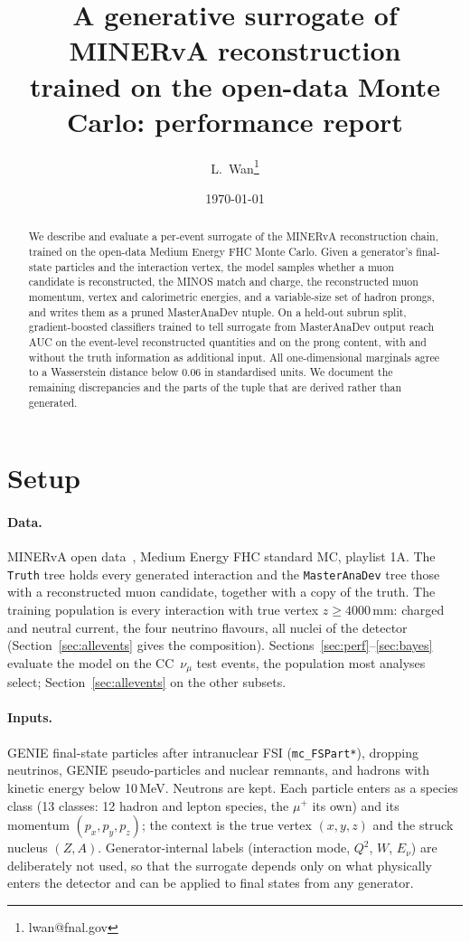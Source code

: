 \documentclass[11pt]{article}
\title{A generative surrogate of MINERvA reconstruction\\ trained on the open-data Monte Carlo: performance report}
\author{L.~Wan\thanks{lwan@fnal.gov}}
\date{\today}
\begin{document}
\maketitle

\begin{abstract}
We describe and evaluate a per-event surrogate of the MINERvA reconstruction chain, trained on the open-data
Medium Energy FHC Monte Carlo. Given a generator's final-state particles and the interaction vertex, the model
samples whether a muon candidate is reconstructed, the MINOS match and charge, the reconstructed muon momentum,
vertex and calorimetric energies, and a variable-size set of hadron prongs, and writes them as a pruned
MasterAnaDev ntuple. On a held-out subrun split, gradient-boosted classifiers trained to tell surrogate from
MasterAnaDev output reach AUC \nAUCmarg{} on the event-level reconstructed quantities and
\nAUCprong{} on the prong content, with and without the truth information as additional input. All
one-dimensional marginals agree to a Wasserstein distance below 0.06 in standardised units. We document the
remaining discrepancies and the parts of the tuple that are derived rather than generated.
\end{abstract}

\tableofcontents
\listoffigures
\listoftables
\clearpage

\section{Setup}
\label{sec:setup}

\paragraph{Data.} MINERvA open data~\cite{opendata}, Medium Energy FHC standard MC, playlist 1A. The
\texttt{Truth} tree holds every generated interaction and the \texttt{MasterAnaDev} tree those with a
reconstructed muon candidate, together with a copy of the truth. The training population is every interaction
with true vertex $z \ge 4000$\,mm: charged and neutral current, the four neutrino flavours, all nuclei of the
detector (Section~\ref{sec:allevents} gives the composition). Sections~\ref{sec:perf}--\ref{sec:bayes} evaluate
the model on the CC~$\nu_\mu$ test events, the population most analyses select; Section~\ref{sec:allevents} on
the other subsets. 

\paragraph{Inputs.} GENIE final-state particles after intranuclear FSI (\texttt{mc\_FSPart*}), dropping
neutrinos, GENIE pseudo-particles and nuclear remnants, and hadrons with kinetic energy below 10\,MeV. Neutrons
are kept. Each particle enters as a species class (13 classes: 12 hadron and lepton species, the $\mu^+$ its own)
and its momentum $(p_x, p_y, p_z)$; the context is
the true vertex $(x,y,z)$ and the struck nucleus $(Z, A)$. Generator-internal labels (interaction mode, $Q^2$,
$W$, $E_\nu$) are deliberately not used, so that the surrogate depends only on what physically enters the
detector and can be applied to final states from any generator.
\end{document}
